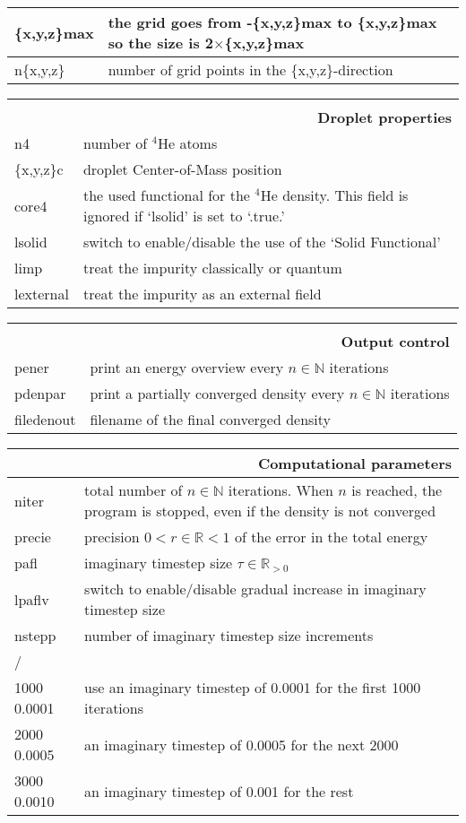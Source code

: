 \documentclass[10pt,a4paper]{article}
\begin{document}
\begin{center}
\begin{tabular}{l|p{9.6cm}}
		\hline\hline
		\{x,y,z\}max	&	the grid goes from -\{x,y,z\}max to \{x,y,z\}max so the size is 2$\times$\{{x,y,z}\}max \\
		\hline
		n\{x,y,z\}		&	number of grid points in the \{x,y,z\}-direction
	\end{tabular}
	\begin{tabular}{l|p{9.6cm}}
		\multicolumn{2}{r}{\textbf{}}	\\
		\multicolumn{2}{r}{\textbf{Droplet properties}}	\\
		\hline\hline
		n4				&	number of $^4$He atoms	\\
		\hline
		\{x,y,z\}c		&	droplet Center-of-Mass position	\\
		\hline
		core4		& the used functional for the $^4$He density. This field is ignored if `lsolid' is set to `.true.'\\
		\hline
		lsolid		& switch to enable/disable the use of the `Solid Functional' \\
		\hline
		limp		& treat the impurity classically or quantum\\
		\hline
		lexternal	& treat the impurity as an external field
	\end{tabular}
	\begin{tabular}{l|p{9.6cm}}
		\multicolumn{2}{r}{\textbf{}}	\\
		\multicolumn{2}{r}{\textbf{Output control}}	\\
		\hline\hline
		pener & print an energy overview every $n\in\mathbb{N}$ iterations	\\
		\hline
		pdenpar	& print a partially converged density every $n\in\mathbb{N}$ iterations	\\
		\hline
		filedenout 	& filename of the final converged density
	\end{tabular}
	\begin{tabular}{l|p{9.6cm}}
		\multicolumn{2}{r}{\textbf{Computational parameters}}	\\
		\hline\hline
		niter		& total number of $n\in\mathbb{N}$ iterations. When $n$ is reached, the program is stopped, even if the density is not converged\\
		\hline
		precie		& precision $0<r\in\mathbb{R}<1$ of the error in the total energy\\
		\hline
		pafl		& imaginary timestep size $\tau\in\mathbb{R}_{>0}$\\
		\hline
		lpaflv		& switch to enable/disable gradual increase in imaginary timestep size\\
		\hline
		nstepp		& number of imaginary timestep size increments\\
		\hline
		/ & 	\\
		1000 0.0001 & use an imaginary timestep of 0.0001 for the first 1000 iterations \\
		2000 0.0005 & an imaginary timestep of 0.0005 for the next 2000  \\
		3000	0.0010 & an imaginary timestep of 0.001 for the rest
	\end{tabular}
	\end{center}
\end{document}
